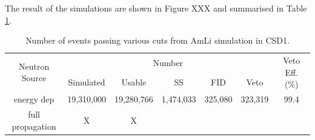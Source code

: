 \par
The result of the simulations are shown in Figure XXX and summarised in Table \ref{tab:amli_neutron_simulations_veto_efficiency}.

\begin{table}[!htbp]
    \centering
    \begin{tabular}{c|c|c|c|c|c|c}
         \multirow{2}{*}{Neutron Source} & \multicolumn{5}{c|}{Number}                  & \multirow{2}{*}{Veto Eff. (\%)}  \\ 
                         & Simulated  & Usable     & SS        & FID     & Veto         &                                  \\ \hline
        energy dep       & 19,310,000 & 19,280,766 & 1,474,033 & 325,080 & 323,319      & 99.4                             \\
        full propagation & X          & X          &           &         &              & 
    \end{tabular}
    \caption{Number of events passing various cuts from AmLi simulation in CSD1.}
    \label{tab:amli_neutron_simulations_veto_efficiency}
\end{table}








